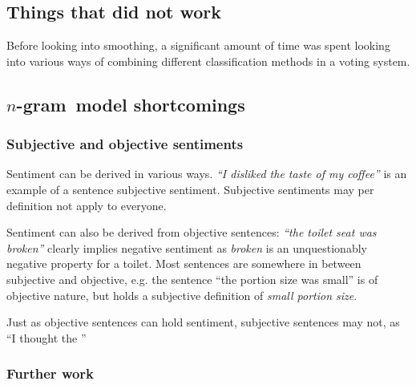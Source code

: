 \documentclass[a4paper,11pt]{kth-mag}
\newcommand{\ngram}{$n$-gram}
\begin{document}
\subsection{Things that did not work}
Before looking into smoothing, a significant amount of time was spent looking into
various ways of combining different classification methods in a voting system.






\subsection{\ngram~model shortcomings}
\subsubsection{Subjective and objective sentiments}
Sentiment can be derived in various ways. \emph{``I disliked the taste of my coffee''} is an example of a sentence subjective sentiment. Subjective sentiments may per definition not apply to everyone.

Sentiment can also be derived from objective sentences: \emph{``the toilet seat was broken''} clearly implies negative sentiment as \emph{broken} is an unquestionably negative property for a toilet. Most sentences are somewhere in between subjective and objective, e.g. the sentence ``the portion size was small'' is of objective nature, but holds a subjective definition of \emph{small portion size}.

Just as objective sentences can hold sentiment, subjective sentences may not, as ``I thought the ''


\subsubsection{Further work}


\end{document}
